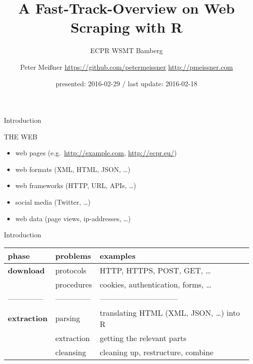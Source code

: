 \documentclass[9pt,ignorenonframetext,]{beamer}
\title{A Fast-Track-Overview on Web Scraping with R}
\subtitle{ECPR WSMT Bamberg}
\author{Peter Meißner \newline \newline \url{https://github.com/petermeissner}
\newline \url{http://pmeissner.com} \newline}
\date{presented: 2016-02-29 / last update: 2016-02-18}
\providecommand{\tightlist}{%
  \setlength{\itemsep}{0pt}\setlength{\parskip}{0pt}}
\begin{document}
\frame{\titlepage}

\begin{frame}{Introduction}

THE WEB

\begin{itemize}
\tightlist
\item
  web pages (e.g.~\url{http://example.com}, \url{http://ecpr.eu/})
\item
  web formats (XML, HTML, JSON, \ldots{})
\item
  web frameworks (HTTP, URL, APIs, \ldots{})
\item
  social media (Twitter, \ldots{})
\item
  web data (page views, ip-addresses, \ldots{})
\end{itemize}

\end{frame}

\begin{frame}{Introduction}

\begin{longtable}[c]{@{}lll@{}}
\toprule
\textbf{phase} & \textbf{problems} & \textbf{examples}\tabularnewline
\midrule
\endhead
\textbf{download} & protocols & HTTP, HTTPS, POST, GET,
\ldots{}\tabularnewline
~ & procedures & cookies, authentication, forms, \ldots{}\tabularnewline
-------------- & -------------- &
------------------------------\tabularnewline
\textbf{extraction} & parsing & translating HTML (XML, JSON, \ldots{})
into R\tabularnewline
~ & extraction & getting the relevant parts\tabularnewline
~ & cleansing & cleaning up, restructure, combine\tabularnewline
\bottomrule
\end{longtable}

\end{frame}
\end{document}
